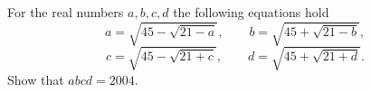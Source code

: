 For the real numbers $a,b,c,d$ the following equations hold
$$a=\sqrt{45-\sqrt{21-a}}, \qquad b=\sqrt{45+\sqrt{21-b}},$$
$$c=\sqrt{45-\sqrt{21+c}}, \qquad d=\sqrt{45+\sqrt{21+d}}.$$
Show that $abcd=2004$.